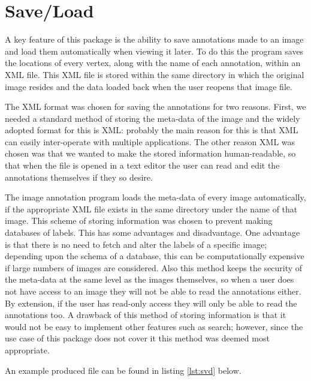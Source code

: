 \section{Save\slash Load}
A key feature of this package is the ability to save annotations made to an image and load them automatically when viewing it later. To do this the program saves the locations of every vertex, along with the name of each annotation, within an XML file.  This XML file is stored within the same directory in which the original image resides and the data loaded back when the user reopens that image file.

The XML format was chosen for saving the annotations for two reasons. First, we needed a standard method of storing the meta-data of the image and the widely adopted format for this is XML: probably the main reason for this is that XML can easily inter-operate with multiple applications.  The other reason XML was chosen was that we wanted to make the stored information human-readable, so that when the file is opened in a text editor the user can read and edit the annotations themselves if they so desire.

The image annotation program loads the meta-data of every image automatically, if the appropriate XML file exists in the same directory under the name of that image. This scheme of storing information was chosen to prevent making databases of labels. This has some advantages and disadvantage. One advantage is that there is no need to fetch and alter the labels of a specific image; depending upon the schema of a database, this can be computationally expensive if large numbers of images are considered. Also this method keeps the security of the meta-data at the same level as the images themselves, so when a user does not have access to an image they will not be able to read the annotations either.  By extension, if the user has read-only access they will only be able to read the annotations too. A drawback of this method of storing information is that it would not be easy to implement other features such as search; however, since the use case of this package does not cover it this method was deemed most appropriate.

An example produced file can be found in listing \ref{lst:svd} below.    

\begin{center}
\lstset{language=XML, basicstyle=\footnotesize\ttfamily, caption=XML file used to store image labels,frame=single,captionpos=b,label=lst:svd}

\end{center}
